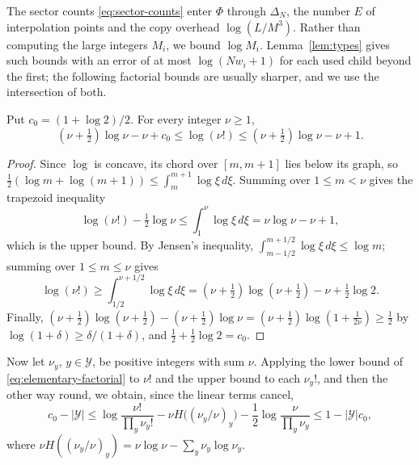The sector counts \eqref{eq:sector-counts} enter \(\Phi\) through
\(\Delta_N\), the number \(E\) of interpolation points and the copy
overhead \(\log(L/M^3)\). Rather than computing the large integers
\(M_i\), we bound \(\log M_i\). Lemma~\ref{lem:types} gives such bounds
with an error of at most \(\log(Nw_i+1)\) for each used child beyond the
first; the following factorial bounds are usually sharper, and we use the
intersection of both.

\begin{lemma}\label{lem:factorial}
Put \(c_0=(1+\log2)/2\). For every integer \(\nu\ge1\),
\begin{equation}\label{eq:elementary-factorial}
 (\nu+\tfrac12)\log\nu-\nu+c_0
 \le\log(\nu!)\le(\nu+\tfrac12)\log\nu-\nu+1.
\end{equation}
\end{lemma}

\begin{proof}
Since \(\log\) is concave, its chord over \([m,m+1]\) lies below its
graph, so
\(\frac12(\log m+\log(m+1))\le\int_m^{m+1}\log\xi\,d\xi\). Summing over
\(1\le m<\nu\) gives the trapezoid inequality
\[
 \log(\nu!)-\tfrac12\log\nu
 \le\int_1^{\nu}\log\xi\,d\xi=\nu\log\nu-\nu+1,
\]
which is the upper bound. By Jensen's inequality,
\(\int_{m-1/2}^{m+1/2}\log\xi\,d\xi\le\log m\); summing over
\(1\le m\le\nu\) gives
\[
 \log(\nu!)\ge\int_{1/2}^{\nu+1/2}\log\xi\,d\xi
 =(\nu+\tfrac12)\log(\nu+\tfrac12)-\nu+\tfrac12\log2 .
\]
Finally, \((\nu+\frac12)\log(\nu+\frac12)-(\nu+\frac12)\log\nu
=(\nu+\frac12)\log(1+\frac1{2\nu})\ge\frac12\) by
\(\log(1+\delta)\ge\delta/(1+\delta)\), and \(\frac12+\frac12\log2=c_0\).
\end{proof}

Now let \(\nu_y\), \(y\in\mathcal Y\), be positive integers with sum
\(\nu\). Applying the lower bound of \eqref{eq:elementary-factorial} to
\(\nu!\) and the upper bound to each \(\nu_y!\), and then the other way
round, we obtain, since the linear terms cancel,
\begin{equation}\label{eq:finite-multinomial}
 c_0-|\mathcal Y|
 \le\log\frac{\nu!}{\prod_{y}\nu_y!}
   -\nu H\bigl((\nu_y/\nu)_{y}\bigr)
   -\frac12\log\frac{\nu}{\prod_{y}\nu_y}
 \le1-|\mathcal Y|c_0 ,
\end{equation}
where \(\nu H((\nu_y/\nu)_y)=\nu\log\nu-\sum_y\nu_y\log\nu_y\).


